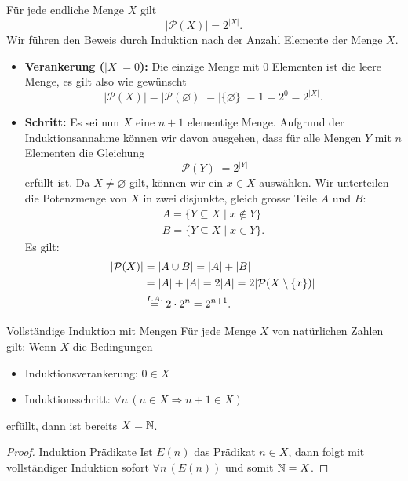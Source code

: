 \begin{example}
    Für jede endliche Menge $X$ gilt
    \[
        |\mathcal{P}(X)|=2^{|X|}.
    \]
    \tcblower
    Wir führen den Beweis durch Induktion nach der Anzahl Elemente der Menge $X$.
    \begin{itemize}
        \item \textbf{Verankerung ($|X|=0$):} Die einzige Menge mit $0$ Elementen ist die leere Menge, es gilt also wie gewünscht
            \[
                |\mathcal{P}(X)|=|\mathcal{P}(\varnothing)|=|\{\varnothing\}|=1=2^0=2^{|X|}.
            \]
        \item \textbf{Schritt:} Es sei nun $X$ eine $n+1$ elementige Menge. Aufgrund der Induktionsannahme können wir davon ausgehen, dass für alle Mengen $Y$ mit $n$ Elementen die Gleichung
            \[
                |\mathcal{P}(Y)|=2^{|Y|}
            \]
            erfüllt ist. Da $X\neq\varnothing$ gilt, können wir ein $x\in X$ auswählen. Wir unterteilen die Potenzmenge von $X$ in zwei disjunkte, gleich grosse Teile $A$ und $B$:
            \begin{align*}
                A=\{Y\subseteq X\mid x\notin Y \}\\
                B=\{Y\subseteq X\mid x\in Y \}.
            \end{align*}
            Es gilt:
            \begin{align*}
                |\mathcal{P}(X)|&=|A\cup B|=|A|+|B|\\
                &=|A|+|A|=2|A|=2|\mathcal{P}(X\setminus\{x\})|\\&\stackrel{I.A.}{=}2\cdot2^n=2^{n+1}.\qedhere
            \end{align*}
    \end{itemize}
\end{example}

\begin{lemma}{Vollständige Induktion mit Mengen}
    Für jede Menge $X$ von natürlichen Zahlen gilt: Wenn $X$ die Bedingungen
    \begin{itemize}
        \item Induktionsverankerung: $0\in X$
        \item Induktionsschritt: $\forall n\,(n\in X\Rightarrow n+1\in X)$
    \end{itemize}
    erfüllt, dann ist bereits $X=\mathbb{N}$.
\end{lemma}

\begin{proof}{Induktion Prädikate}
    Ist $E(n)$ das Prädikat $n\in X$, dann folgt mit vollständiger Induktion sofort $\forall n\, (E(n))$ und somit $\mathbb{N}=X$.
\end{proof}

